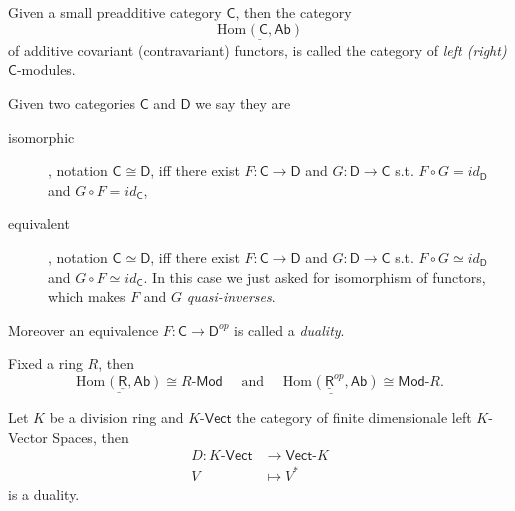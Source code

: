 \begin{defn}
	Given a small preadditive category $\mathsf{C}$, then the category
	\begin{equation}
		\underline{\mathrm{Hom}_{\mathsf{}} \left( \mathsf{C}, \mathsf{Ab} \right)}
	\end{equation} 
	of additive covariant (contravariant) functors, is called the category of {\em left (right) } $\mathsf{C}$-modules.
\end{defn}

\begin{defn}
	Given two categories $\mathsf{C}$ and $\mathsf{D}$ we say they are
	\begin{description}
		\item[isomorphic], notation $\mathsf{C} \cong \mathsf{D}$, iff there exist $F: \mathsf{C} \to \mathsf{D}$ and $G: \mathsf{D} \to \mathsf{C}$ s.t. $F \circ G = id_{\mathsf{D}}$ and $G \circ F = id_\mathsf{C}$,
		\item[equivalent], notation $\mathsf{C} \simeq \mathsf{D}$, iff there exist $F: \mathsf{C} \to \mathsf{D}$ and $G: \mathsf{D} \to \mathsf{C}$ s.t. $F \circ G \simeq id_{\mathsf{D}}$ and $G \circ F \simeq id_\mathsf{C}$.
			In this case we just asked for isomorphism of functors, which makes $F$ and $G$ {\em quasi-inverses}.
	\end{description} 

	Moreover an equivalence $F: \mathsf{C} \to \mathsf{D}^{op}$ is called a  {\em duality}.
\end{defn}

\begin{rem}
	Fixed a ring $R$, then 
	\begin{equation}
		\underline{\mathrm{Hom}_{\mathsf{}} \left( \underline{\mathsf{R}}, \mathsf{Ab} \right)} \cong R \text{-}\mathsf{Mod} 
		\quad \text{ and } \quad
		\underline{\mathrm{Hom}_{\mathsf{}} \left( \underline{\mathsf{R}}^{op}, \mathsf{Ab} \right)} \cong \mathsf{Mod}\text{-}R
	.\end{equation} 
\end{rem}

\begin{ex}[duality]
	Let $K$ be a division ring and $K$-$\mathsf{Vect}$ the category of finite dimensionale left $K$-Vector Spaces, then
	\begin{align}
		D: K \text{-}\mathsf{Vect} &\to \mathsf{Vect} \text{-}K \\
		V &\mapsto V^*
	\end{align} 
	is a duality.
\end{ex} 

